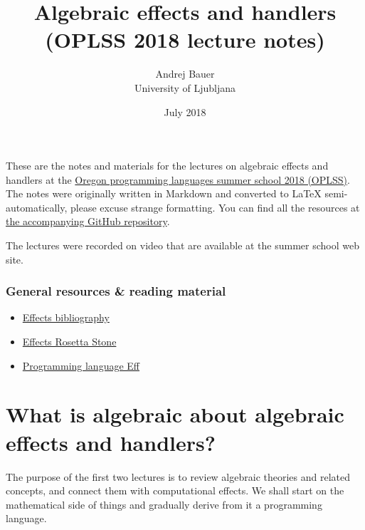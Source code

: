 \documentclass{article}
\begin{document}
\title{Algebraic effects and handlers\\(OPLSS 2018 lecture notes)}
\author{Andrej Bauer\\University of Ljubljana}
\date{July 2018}

\maketitle

These are the notes and materials for the lectures on algebraic effects and
handlers at the
\href{https://www.cs.uoregon.edu/research/summerschool/summer18/index.php}{Oregon
  programming languages summer school 2018 (OPLSS)}. The notes were originally
written in Markdown and converted to {\LaTeX} semi-automatically, please excuse
strange formatting. You can find all the resources at
\href{https://github.com/OPLSS/introduction-to-algebraic-effects-and-handlers}{the
  accompanying GitHub repository}.

The lectures were recorded on video that are available at the summer school web
site.

\hypertarget{general-resources-reading-material}{%
\subsubsection*{General resources \& reading
material}\label{general-resources-reading-material}}

\begin{itemize}
\item
  \href{https://github.com/yallop/effects-bibliography}{Effects
  bibliography}
\item
  \href{https://github.com/effect-handlers/effects-rosetta-stone}{Effects
  Rosetta Stone}
\item
  \href{http://www.eff-lang.org}{Programming language Eff}
\end{itemize}

\hypertarget{what-is-algebraic-about-algebraic-effects-and-handlers}{%
\section{What is algebraic about algebraic effects and
handlers?}\label{what-is-algebraic-about-algebraic-effects-and-handlers}}

The purpose of the first two lectures is to review algebraic theories and
related concepts, and connect them with computational effects. We shall start on
the mathematical side of things and gradually derive from it a programming
language.
\end{document}
